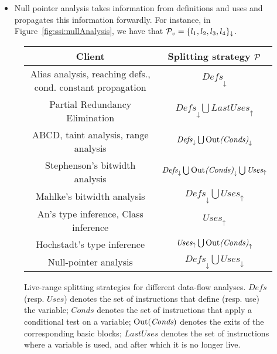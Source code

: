{\begin{itemize}
\item Null pointer analysis takes information from definitions and uses and propagates this 
  information forwardly.
For instance, in Figure~\ref{fig:ssi:nullAnalysis}, we have that
${\cal P}_{v} = \{l_1, l_2, l_3, l_4\}_\downarrow$.
\end{itemize}

\begin{figure}[t!]
\begin{center}
\begin{small}
\renewcommand\arraystretch{1.4}
\begin{tabular}{ c | c }
{\bf Client} & {\bf Splitting strategy ${\cal P}$} \\  \hline

Alias analysis, reaching defs., cond. constant propagation  
& $\textit{Defs}_\downarrow$ \\

Partial Redundancy Elimination & $\textit{Defs}_\downarrow \bigcup \textit{LastUses}_\uparrow$ \\

ABCD, taint analysis, range analysis & $\textit{Defs}_\downarrow \bigcup 
\textrm{Out}\textit{(Conds)}_\downarrow$ \\

Stephenson's bitwidth analysis & $\textit{Defs}_\downarrow \bigcup 
\textrm{Out}\textit{(Conds)}_\downarrow \bigcup \textit{Uses}_\uparrow$  \\

Mahlke's bitwidth analysis & $\textit{Defs}_\downarrow \bigcup 
\textit{Uses}_\uparrow$  \\

An's type inference, Class inference & $\textit{Uses}_\uparrow$ \\

Hochstadt's type inference & $\textit{Uses}_\uparrow \bigcup 
\textrm{Out}\textit{(Conds)}_\uparrow$ \\

Null-pointer analysis & $\textit{Defs}_\downarrow 
\bigcup\textit{Uses}_\downarrow$ \\

\end{tabular}
\end{small}

\caption{Live-range splitting strategies for different data-flow analyses.
$\textit{Defs}$ (resp. $\textit{Uses}$) denotes the set of instructions that define (resp. use) the variable; $\textit{Conds}$ denotes the set of instructions that apply a conditional test on a variable; $\textrm{Out}(\textit{Conds})$ denotes the exits of the corresponding basic blocks; $\textit{LastUses}$ denotes the set of instructions where a variable is used, and after which it is no longer live.}
\label{fig:splittingSt} \end{center} \end{figure}

}
